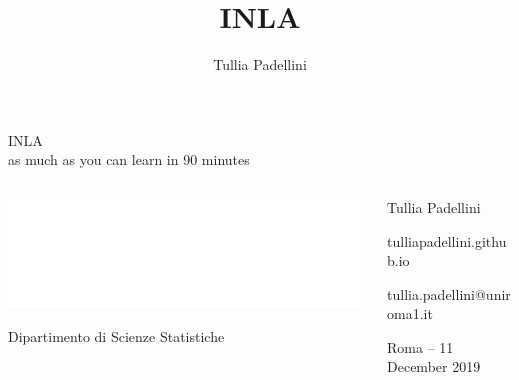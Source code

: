 \documentclass[9pt,ignorenonframetext,]{beamer}
\title{INLA}
\author{Tullia Padellini}
\date{}
\begin{document}
\frame{\titlepage}

\begin{frame}


\color{white}\sffamily

\hfill \huge{INLA\\ \hfill \Large{as much as you can learn in 90 minutes}}
\vspace{0.6cm}

\begin{columns}

\begin{column}{0.45\textwidth}
\vspace{1.55cm}

\includegraphics[width=.7\textwidth]{sapienza-logo-png-6.png}

{\small Dipartimento di Scienze Statistiche}

\end{column}

\begin{column}{0.45\textwidth}

\hfill \Large{Tullia Padellini}

\vspace{0.25cm}


\hfill \scriptsize{tulliapadellini.github.io     \faLaptop} 

\hfill \scriptsize{tullia.padellini@uniroma1.it   \faEnvelope}

\vspace{0.5cm}
\vspace{0.3cm}




\vspace{0.7cm}
\vfill
\hfill Roma -- 11 December 2019 
\end{column}

\end{columns}

\clearpage

\end{frame}
\end{document}
